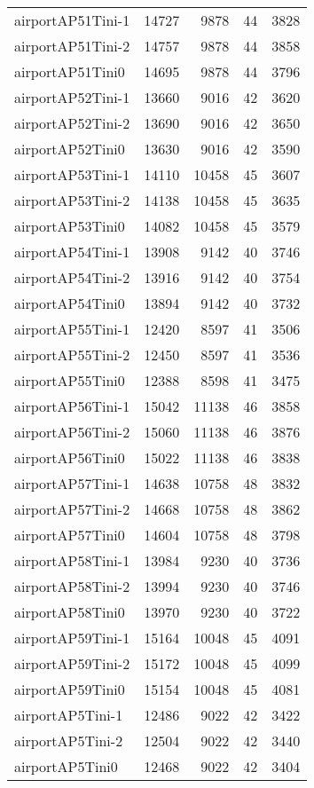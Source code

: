 \begin{longtable}{lrrrr}
airportAP51Tini-1 & 14727 & 9878 & 44 & 3828 \\
airportAP51Tini-2 & 14757 & 9878 & 44 & 3858 \\
airportAP51Tini0 & 14695 & 9878 & 44 & 3796 \\
airportAP52Tini-1 & 13660 & 9016 & 42 & 3620 \\
airportAP52Tini-2 & 13690 & 9016 & 42 & 3650 \\
airportAP52Tini0 & 13630 & 9016 & 42 & 3590 \\
airportAP53Tini-1 & 14110 & 10458 & 45 & 3607 \\
airportAP53Tini-2 & 14138 & 10458 & 45 & 3635 \\
airportAP53Tini0 & 14082 & 10458 & 45 & 3579 \\
airportAP54Tini-1 & 13908 & 9142 & 40 & 3746 \\
airportAP54Tini-2 & 13916 & 9142 & 40 & 3754 \\
airportAP54Tini0 & 13894 & 9142 & 40 & 3732 \\
airportAP55Tini-1 & 12420 & 8597 & 41 & 3506 \\
airportAP55Tini-2 & 12450 & 8597 & 41 & 3536 \\
airportAP55Tini0 & 12388 & 8598 & 41 & 3475 \\
airportAP56Tini-1 & 15042 & 11138 & 46 & 3858 \\
airportAP56Tini-2 & 15060 & 11138 & 46 & 3876 \\
airportAP56Tini0 & 15022 & 11138 & 46 & 3838 \\
airportAP57Tini-1 & 14638 & 10758 & 48 & 3832 \\
airportAP57Tini-2 & 14668 & 10758 & 48 & 3862 \\
airportAP57Tini0 & 14604 & 10758 & 48 & 3798 \\
airportAP58Tini-1 & 13984 & 9230 & 40 & 3736 \\
airportAP58Tini-2 & 13994 & 9230 & 40 & 3746 \\
airportAP58Tini0 & 13970 & 9230 & 40 & 3722 \\
airportAP59Tini-1 & 15164 & 10048 & 45 & 4091 \\
airportAP59Tini-2 & 15172 & 10048 & 45 & 4099 \\
airportAP59Tini0 & 15154 & 10048 & 45 & 4081 \\
airportAP5Tini-1 & 12486 & 9022 & 42 & 3422 \\
airportAP5Tini-2 & 12504 & 9022 & 42 & 3440 \\
airportAP5Tini0 & 12468 & 9022 & 42 & 3404 \\

\end{longtable}
